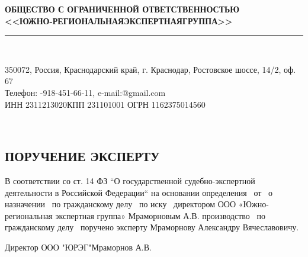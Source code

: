 \setcounter{page}{1}
\pagestyle{empty} %
%
%
\begin{center}
	\normalsize\textbf{ОБЩЕСТВО С ОГРАНИЧЕННОЙ ОТВЕТСТВЕННОСТЬЮ \\[-1.5mm] <<ЮЖНО-РЕГИОНАЛЬНАЯ\quad ЭКСПЕРТНАЯ\quad ГРУППА>> \\[-5mm]}
	\noindent\rule{\textwidth}{1pt}\\[-6mm]  %
\end{center}

\begin{center}
	\begin{footnotesize}
		\vspace{-3.5mm}350072, Россия, Краснодарский край, г. Краснодар, Ростовское шоссе, 14/2, оф. 67\\[0mm]
		Телефон: -918-451-66-11, e-mail:@gmail.com\\ [-2mm]{ИНН 2311213020\quad КПП 231101001 ОГРН 1162375014560}
	\end{footnotesize}	\\[10mm]
\end{center}





\begin{center}
	\section{{\Large \textbf{ПОРУЧЕНИЕ ЭКСПЕРТУ}}}
\end{center}




В соответствии со ст. 14  ФЗ “О государственной судебно-экспертной деятельности в Российской Федерации“ на основании определения \sud \,  от \dataopr  \, о назначении \opr \, по гражданскому делу \delonum \, по иску \isk \,  директором ООО «Южно-региональная экспертная группа»   Мраморновым  А.В.   производство \opr \, по гражданскому делу \delonum \, поручено эксперту    Мраморнову Александру Вячеславовичу. 






\vspace{30mm}

{Директор ООО "ЮРЭГ"}\hfill           {Мраморнов А.В.}